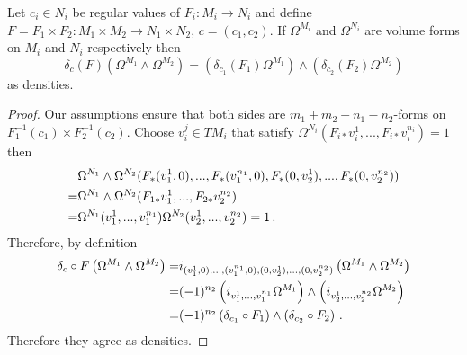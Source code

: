 \begin{theorem}
Let $c_i\in N_i$ be regular values of $F_i:M_i\rightarrow N_i$ and define $F=F_1\times F_2:M_1\times M_2\rightarrow N_1\times N_2$, $c=(c_1,c_2)$.  If $\Omega^{M_i}$ and $\Omega^{N_i}$ are volume forms on $M_i$ and $N_i$ respectively then 
\begin{equation}
\delta_c( F) \left(\Omega^{M_1}\wedge\Omega^{M_2}\right)=\left(\delta_{c_1}( F_1)\Omega^{M_1}\right)\wedge\left(\delta_{c_2}( F_2)\Omega^{M_2}\right)
\end{equation}
as densities.
\end{theorem}
\begin{proof}
Our assumptions ensure that both sides are $m_1+m_2-n_1-n_2$-forms on $F_1^{-1}(c_1)\times F_2^{-1}(c_2)$.  Choose $v_i^j\in TM_i$ that satisfy $\Omega^{N_i}(F_{i*}v^1_i,...,F_{i*}v^{n_i}_i)=1$ then
\begin{align}
&\Omega^{N_1}\wedge \Omega^{N_2}(F_*(v_1^1,0),...,F_*(v_1^{n_1},0),F_*(0,v_2^1),...,F_*(0,v_2^{n_2}))\\
=&\Omega^{N_1}\wedge \Omega^{N_2}(F_{1*}v_1^1,...,F_{2*}v_2^{n_2})\notag\\
=&\Omega^{N_1}(v_1^1,...,v_1^{n_1})\Omega^{N_2}(v_2^1,...,v_2^{n_2})=1\,.\notag
\end{align}
Therefore, by definition
\begin{align}
\delta_c\circ F \left(\Omega^{M_1}\wedge\Omega^{M_2}\right)=&i_{(v_1^1,0),...,(v_1^{n_1},0),(0,v_2^1),...,(0,v_2^{n_2})}\left(\Omega^{M_1}\wedge\Omega^{M_2}\right)\\
=&(-1)^{n_2}\left(i_{v_1^1,...,v_1^{n_1}}\Omega^{M_1}\right)\wedge\left(i_{v_2^1,...,v_2^{n_2}}\Omega^{M_2}\right)\notag\\
=&(-1)^{n_2}\left(\delta_{c_1}\circ F_1\right)\wedge\left(\delta_{c_2}\circ F_2\right)\,.\notag
\end{align}
Therefore they agree as densities.
\end{proof}

